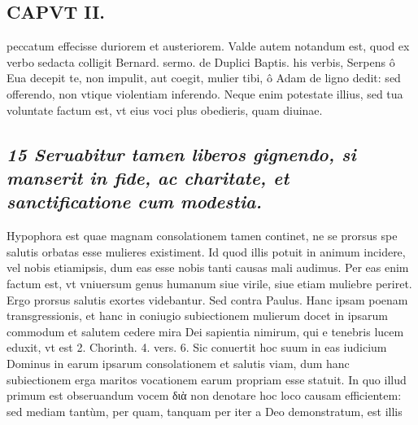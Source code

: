 \documentclass{article}
\begin{document}
\begin{pages}
\section*{CAPVT II. }
\marginpar{[ p.89 ]}\pstart peccatum effecisse duriorem et austeriorem. Valde autem notandum est, quod ex verbo sedacta colligit Bernard. sermo. de Duplici Baptis. his verbis, Serpens ô Eua decepit te, non impulit, aut coegit, mulier tibi, ô Adam de ligno dedit: sed offerendo, non vtique violentiam inferendo. Neque enim potestate illius, sed tua voluntate factum est, vt eius voci plus obedieris, quam diuinae.  \pend
{}
{}
\subsection*{\textit{15 Seruabitur tamen liberos gignendo, si manserit in fide, ac charitate, et sanctificatione cum modestia. }}\pstart Hypophora est quae magnam consolationem tamen continet, ne se prorsus spe salutis orbatas esse mulieres existiment. Id quod illis potuit in animum incidere, vel nobis etiamipsis, dum eas esse nobis tanti causas mali audimus. Per eas enim factum est, vt vniuersum genus humanum siue virile, siue etiam muliebre periret. Ergo prorsus salutis exortes videbantur. Sed contra Paulus. Hanc ipsam poenam transgressionis, et hanc in coniugio subiectionem mulierum docet in ipsarum commodum et salutem cedere mira Dei sapientia nimirum, qui e tenebris lucem eduxit, vt est 2. Chorinth. 4. vers. 6. Sic conuertit hoc suum in eas iudicium Dominus in earum ipsarum consolationem et salutis viam, dum hanc subiectionem erga maritos vocationem earum propriam esse statuit. In quo illud primum est obseruandum vocem διὰ non denotare hoc loco causam efficientem: sed mediam tantùm, per quam, tanquam per iter a Deo demonstratum, est illis  \pend

\end{pages}
\end{document}
